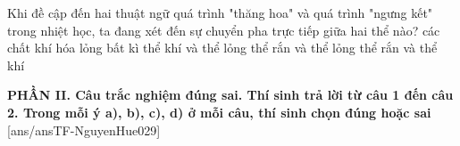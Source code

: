 \begin{ex}	Khi đề cập đến hai thuật ngữ quá trình "thăng hoa" và quá trình "ngưng kết" trong nhiệt học, ta đang xét đến sự chuyển pha trực tiếp giữa hai thể nào?
	\choice
	{các chất khí hóa lỏng bất kì}
	{thể khí và thể lỏng}
	{thể rắn và thể lỏng}
	{\True thể rắn và thể khí}
\end{ex}


\noindent \textbf{PHẦN II. Câu trắc nghiệm đúng sai. Thí sinh trả lời từ câu 1 đến câu 2. Trong mỗi ý a), b), c), d) ở mỗi câu, thí sinh chọn đúng hoặc sai}
[ans/ansTF-NguyenHue029]

